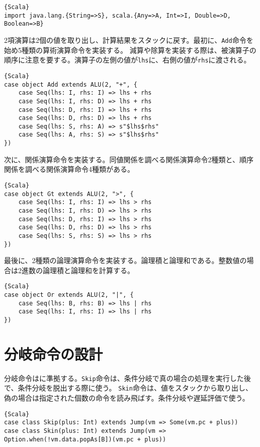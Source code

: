 \documentclass[10pt,a4paper]{book}
\begin{document}
\begin{Verbatim}{Scala}
import java.lang.{String=>S}, scala.{Any=>A, Int=>I, Double=>D, Boolean=>B}
\end{Verbatim}

2項演算は2個の値を取り出し、計算結果をスタックに戻す。最初に、\texttt{Add}命令を始め5種類の算術演算命令を実装する。
減算や除算を実装する際は、被演算子の順序に注意を要する。演算子の左側の値が\texttt{lhs}に、右側の値が\texttt{rhs}に渡される。

\begin{Verbatim}{Scala}
case object Add extends ALU(2, "+", {
	case Seq(lhs: I, rhs: I) => lhs + rhs
	case Seq(lhs: I, rhs: D) => lhs + rhs
	case Seq(lhs: D, rhs: I) => lhs + rhs
	case Seq(lhs: D, rhs: D) => lhs + rhs
	case Seq(lhs: S, rhs: A) => s"$lhs$rhs"
	case Seq(lhs: A, rhs: S) => s"$lhs$rhs"
})
\end{Verbatim}

次に、関係演算命令を実装する。同値関係を調べる関係演算命令2種類と、順序関係を調べる関係演算命令4種類がある。

\begin{Verbatim}{Scala}
case object Gt extends ALU(2, ">", {
	case Seq(lhs: I, rhs: I) => lhs > rhs
	case Seq(lhs: I, rhs: D) => lhs > rhs
	case Seq(lhs: D, rhs: I) => lhs > rhs
	case Seq(lhs: D, rhs: D) => lhs > rhs
	case Seq(lhs: S, rhs: S) => lhs > rhs
})
\end{Verbatim}

最後に、2種類の論理演算命令を実装する。論理積と論理和である。整数値の場合は2進数の論理積と論理和を計算する。

\begin{Verbatim}{Scala}
case object Or extends ALU(2, "|", {
	case Seq(lhs: B, rhs: B) => lhs | rhs
	case Seq(lhs: I, rhs: I) => lhs | rhs
})
\end{Verbatim}

\section{分岐命令の設計\label{sect:jump}}

分岐命令はに準拠する。\texttt{Skip}命令は、条件分岐で真の場合の処理を実行した後で、条件分岐を脱出する際に使う。
\texttt{Skin}命令は、値をスタックから取り出し、偽の場合は指定された個数の命令を読み飛ばす。条件分岐や遅延評価で使う。

\begin{Verbatim}{Scala}
case class Skip(plus: Int) extends Jump(vm => Some(vm.pc + plus))
case class Skin(plus: Int) extends Jump(vm => Option.when(!vm.data.popAs[B])(vm.pc + plus))
\end{Verbatim}
\end{document}
